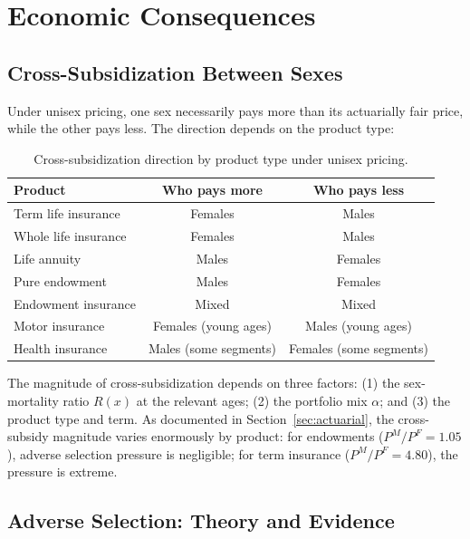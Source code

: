 \documentclass[12pt,a4paper]{article}
\begin{document}
\section{Economic Consequences}
\label{sec:economic}

\subsection{Cross-Subsidization Between Sexes}
\label{subsec:cross-subsidy-econ}

Under unisex pricing, one sex necessarily pays more than its actuarially fair price, while the other pays less. The direction depends on the product type:

\begin{table}[H]
\centering
\caption{Cross-subsidization direction by product type under unisex pricing.}
\label{tab:cross-subsidy}
\begin{tabular}{lcc}
\toprule
\textbf{Product} & \textbf{Who pays more} & \textbf{Who pays less} \\
\midrule
Term life insurance & Females & Males \\
Whole life insurance & Females & Males \\
Life annuity & Males & Females \\
Pure endowment & Males & Females \\
Endowment insurance & Mixed & Mixed \\
Motor insurance & Females (young ages) & Males (young ages) \\
Health insurance & Males (some segments) & Females (some segments) \\
\bottomrule
\end{tabular}
\end{table}

The magnitude of cross-subsidization depends on three factors: (1) the sex-mortality ratio $R(x)$ at the relevant ages; (2) the portfolio mix $\alpha$; and (3) the product type and term. As documented in Section~\ref{sec:actuarial}, the cross-subsidy magnitude varies enormously by product: for endowments ($P^M/P^F = 1.05$), adverse selection pressure is negligible; for term insurance ($P^M/P^F = 4.80$), the pressure is extreme.

\subsection{Adverse Selection: Theory and Evidence}
\label{subsec:adverse-selection}
\end{document}
